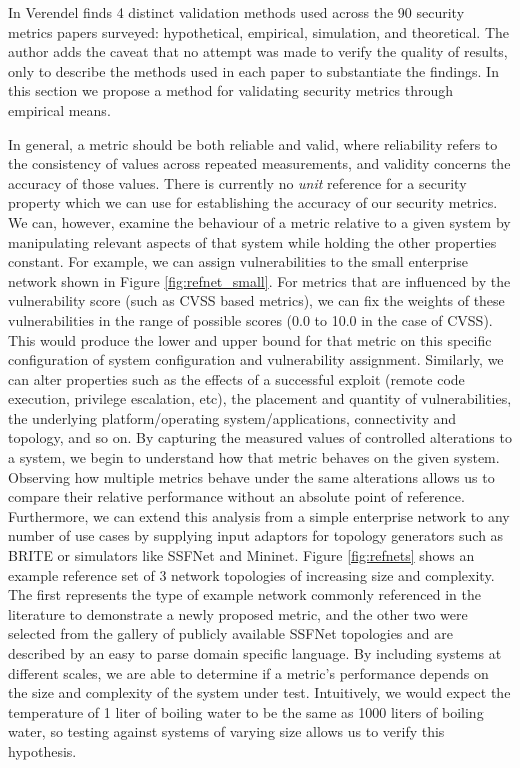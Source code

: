 




In \cite{Verendel_2009} Verendel finds 4 distinct validation methods used across the 90 security metrics papers surveyed: hypothetical, empirical, simulation, and theoretical. The author adds the caveat that no attempt was made to verify the quality of results, only to describe the methods used in each paper to substantiate the findings. In this section we propose a method for validating security metrics through empirical means.

In general, a metric should be both reliable and valid, where reliability refers to the consistency of values across repeated measurements, and validity concerns the accuracy of those values. There is currently no \textit{unit} reference for a security property which we can use for establishing the accuracy of our security metrics. We can, however, examine the behaviour of a metric relative to a given system by manipulating relevant aspects of that system while holding the other properties constant. For example, we can assign vulnerabilities to the small enterprise network shown in Figure \ref{fig:refnet_small}. For metrics that are influenced by the vulnerability score (such as CVSS based metrics), we can fix the weights of these vulnerabilities in the range of possible scores (0.0 to 10.0 in the case of CVSS). This would produce the lower and upper bound for that metric on this specific configuration of system configuration and vulnerability assignment. Similarly, we can alter properties such as the effects of a successful exploit (remote code execution, privilege escalation, etc), the placement and quantity of vulnerabilities, the underlying platform/operating system/applications, connectivity and topology, and so on. By capturing the measured values of controlled alterations to a system, we begin to understand how that metric behaves on the given system. Observing how multiple metrics behave under the same alterations allows us to compare their relative performance without an absolute point of reference. Furthermore, we can extend this analysis from a simple enterprise network to any number of use cases by supplying input adaptors for topology generators such as BRITE\cite{Medina_Lakhina_Matta_Byers_2001} or simulators like SSFNet\cite{Cowie_Ogielski_Nicol_2002} and Mininet\cite{Lantz_Heller_McKeown_2010}. Figure \ref{fig:refnets} shows an example reference set of 3 network topologies of increasing size and complexity. The first represents the type of example network commonly referenced in the literature to demonstrate a newly proposed metric, and the other two were selected from the gallery of publicly available SSFNet topologies and are described by an easy to parse domain specific language. By including systems at different scales, we are able to determine if a metric's performance depends on the size and complexity of the system under test. Intuitively, we would expect the temperature of 1 liter of boiling water to be the same as 1000 liters of boiling water, so testing against systems of varying size allows us to verify this hypothesis.


